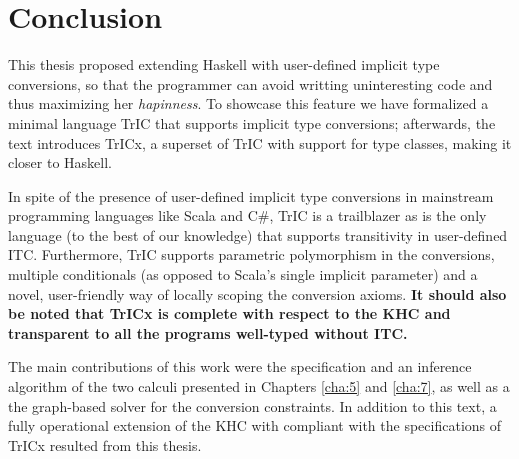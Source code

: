 \chapter{Conclusion}
\label{cha:9}
This thesis proposed extending Haskell with user-defined implicit type conversions, so that the programmer can avoid writting uninteresting code and thus maximizing her \textit{hapinness}. To showcase this feature we have formalized a minimal language TrIC that supports implicit type conversions; afterwards, the text introduces TrICx, a superset of TrIC with support for type classes, making it closer to Haskell.

In spite of the presence of user-defined implicit type conversions in mainstream programming languages like Scala and C\#, TrIC is a trailblazer as is the only language (to the best of our knowledge) that supports transitivity in user-defined ITC. Furthermore, TrIC supports parametric polymorphism in the conversions, multiple conditionals (as opposed to Scala's single implicit parameter) and a novel, user-friendly way of locally scoping the conversion axioms. \textbf{It should also be noted that TrICx is complete with respect to the KHC and transparent to all the programs well-typed without ITC.}

The main contributions of this work were the specification and an inference algorithm of the two calculi presented in Chapters \ref{cha:5} and \ref{cha:7}, as well as a the graph-based solver for the conversion constraints. In addition to this text, a fully operational extension of the KHC with compliant with the specifications of TrICx resulted from this thesis.

